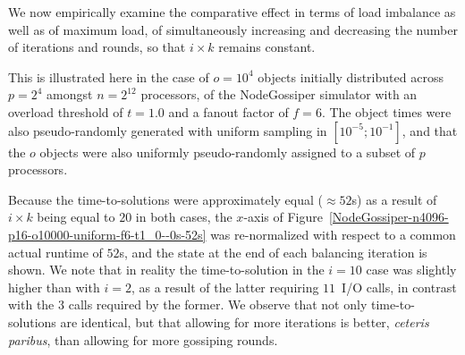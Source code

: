 We now empirically examine the comparative effect in terms of load
imbalance as well as of maximum load, of simultaneously increasing and
decreasing the number of iterations and rounds, so that $i\times{k}$
remains constant.

This is illustrated here in the case of $o=10^4$ objects initially
distributed across $p=2^4$ amongst $n=2^{12}$ processors, of the
\textsf{NodeGossiper} simulator with an overload threshold of $t=1.0$
and a fanout factor of $f=6$.
The object times were also pseudo-randomly generated with uniform
sampling in $[10^{-5};10^{-1}]$, and that the $o$ objects were also
uniformly pseudo-randomly assigned to a subset of $p$ processors.

Because the time-to-solutions were approximately equal ($\approx52$s)
as a result of $i\times{k}$ being equal to $20$ in both cases,
the $x$-axis of
Figure~\ref{NodeGossiper-n4096-p16-o10000-uniform-f6-t1_0--0s-52s}
was re-normalized with respect to a common actual runtime of $52$s,
and the state at the end of each balancing iteration is shown. We note
that in reality the time-to-solution in the $i=10$ case was slightly
higher than with $i=2$, as a result of the latter requiring $11$~I/O
calls, in contrast with the $3$ calls required by the former.
We observe that not only time-to-solutions are identical, but that
allowing for more iterations is better, \emph{ceteris paribus}, than
allowing for more gossiping rounds.